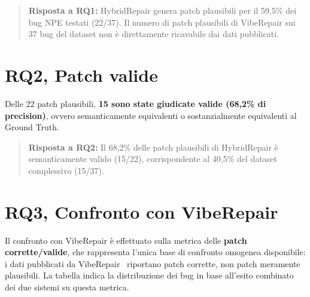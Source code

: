 \begin{quote}
\textbf{Risposta a RQ1:} HybridRepair genera patch plausibili per il 59,5\% dei bug
NPE testati (22/37). Il numero di patch plausibili di VibeRepair sui 37 bug del dataset
non è direttamente ricavabile dai dati pubblicati.
\end{quote}

\section{RQ2, Patch valide}

Delle 22 patch plausibili, \textbf{15 sono state giudicate valide (68,2\% di precision)},
ovvero semanticamente equivalenti o sostanzialmente equivalenti al Ground Truth.

\begin{quote}
\textbf{Risposta a RQ2:} Il 68,2\% delle patch plausibili di HybridRepair è
semanticamente valido (15/22), corrispondente al 40,5\% del dataset complessivo (15/37).
\end{quote}

\section{RQ3, Confronto con VibeRepair}

Il confronto con VibeRepair è effettuato sulla metrica delle \textbf{patch corrette/valide},
che rappresenta l'unica base di confronto omogenea disponibile: i dati pubblicati da
VibeRepair~\cite{zhu2026specification} riportano patch corrette, non patch meramente plausibili.
La tabella indica la distribuzione dei bug in base all'esito combinato
dei due sistemi su questa metrica.

\begin{table}[H]
\centering
\label{tab:rq3}
\small
{}
\end{table}
\newpage

